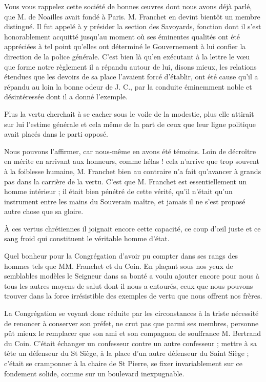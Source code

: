 Vous vous rappelez cette société de bonnes œuvres dont nous avons déjà parlé, que M. de Noailles avait fondé à Paris. M. Franchet en devint bientôt un membre distingué. Il fut appelé à y présider la section des Savoyards, fonction dont il s'est honorablement acquitté jusqu'au moment où ses éminentes qualités ont été appréciées à tel point qu'elles ont déterminé le Gouvernement à lui confier la direction de la police générale. C'est bien là qu'en exécutant à la lettre le vœu que forme notre règlement il a répandu autour de lui, disons mieux, les relations étendues que les devoirs de sa place l'avaient forcé d'établir, ont été cause qu'il a répandu au loin la bonne odeur de J. C., par la conduite éminemment noble et désintéressée dont il a donné l'exemple.

Plus la vertu cherchait à se cacher sous le voile de la modestie, plus elle attirait sur lui l'estime générale et cela même de la part de ceux que leur ligne politique avait placés dans le parti opposé.

Nous pouvons l'affirmer, car nous-même en avons été témoins. Loin de décroître en mérite en arrivant aux honneurs, comme hélas ! cela n'arrive que trop souvent à la foiblesse humaine, M. Franchet bien au contraire n'a fait qu'avancer à grands
pas dans la carrière de la vertu. C'est que M. Franchet est essentiellement un homme intérieur ; il était bien pénétré de cette vérité, qu'il n'était qu'un instrument entre les mains du Souverain maître, et jamais il ne s'est proposé autre chose que sa gloire.

À ces vertus chrétiennes il joignait encore cette capacité, ce coup d'œil juste et ce sang froid qui constituent le véritable homme d'état.

Quel bonheur pour la Congrégation d'avoir pu compter dans ses rangs des hommes tels que MM. Franchet et du Coin. En plaçant sous nos yeux de semblables modèles le Seigneur dans sa bonté a voulu ajouter encore pour nous à tous les autres moyens de salut dont il nous a entourés, ceux que nous pouvons trouver dans la force irrésistible des exemples de vertu que nous offrent nos frères.

La Congrégation se voyant donc réduite par les circonstances à la triste nécessité de renoncer à conserver son préfet, ne crut pas que parmi ses membres, personne pût mieux le remplacer que son ami et son compagnon de souffrance M. Bertrand du Coin. C'était échanger un confesseur contre un autre confesseur ; mettre à sa tête un défenseur du St Siège, à la place d'un autre défenseur du Saint Siège ; c'était se cramponner à la chaire de St Pierre, se fixer invariablement sur ce fondement solide, comme sur un boulevard inexpugnable.

